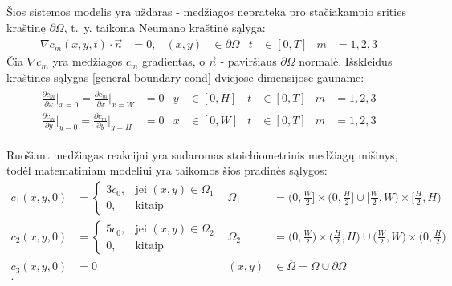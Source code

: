 Šios sistemos modelis yra uždaras - medžiagos neprateka pro stačiakampio srities kraštinę $\partial\Omega$, t.~y. taikoma Neumano kraštinė sąlyga:
\begin{align} \label{general-boundary-cond}
	\nabla c_m(x, y, t)\cdot\vec{n}&=0, & (x, y)&\in\partial\Omega & t&\in[0, T] & m&=1, 2, 3
\end{align}
Čia $\nabla c_m$ yra medžiagos $c_m$ gradientas, o $\vec{n}$ - paviršiaus $\partial\Omega$ normalė. Išskleidus kraštines sąlygas \eqref{general-boundary-cond} dviejose dimensijose gauname:
\begin{equation} \label{boundary-cond}
\begin{aligned}
\begin{split}
    \frac{\partial c_m}{\partial x}\Big|_{x=0}=\frac{\partial c_m}{\partial x}\Big|_{x=W}&=0 & y&\in[0,H] & t&\in[0, T] & m&=1, 2, 3\\
    \frac{\partial c_m}{\partial y}\Big|_{y=0}=\frac{\partial c_m}{\partial y}\Big|_{y=H}&=0 & x&\in[0,W] & t&\in[0, T] & m&=1, 2, 3
\end{split}
\end{aligned}
\end{equation}

\newpage
Ruošiant medžiagas reakcijai yra sudaromas stoichiometrinis medžiagų mišinys, todėl matematiniam modeliui yra taikomos šios pradinės sąlygos:
\begin{equation} \label{intial-cond}
	\begin{aligned}
		c_1(x, y, 0) & = \begin{cases} 3c_0, & \text{jei } (x, y)\in\Omega_1 \\ 0, & \text{kitaip} \end{cases} & \Omega_1&=\big(0, \tfrac{W}{2}\big]\times\big(0, \tfrac{H}{2}\big]\cup\big[\tfrac{W}{2}, W\big)\times\big[\tfrac{H}{2}, H\big)\\
		c_2(x, y, 0) & = \begin{cases} 5c_0, & \text{jei } (x, y)\in\Omega_2 \\ 0, & \text{kitaip} \end{cases} & \Omega_2&=\big(0, \tfrac{W}{2}\big)\times\big(\tfrac{H}{2}, H\big)\cup\big(\tfrac{W}{2}, W\big)\times\big(0, \tfrac{H}{2}\big)\\
		c_3(x, y, 0)&=0 & (x, y)&\in\overline{\Omega}=\Omega\cup\partial\Omega\\.
	\end{aligned}
\end{equation}

